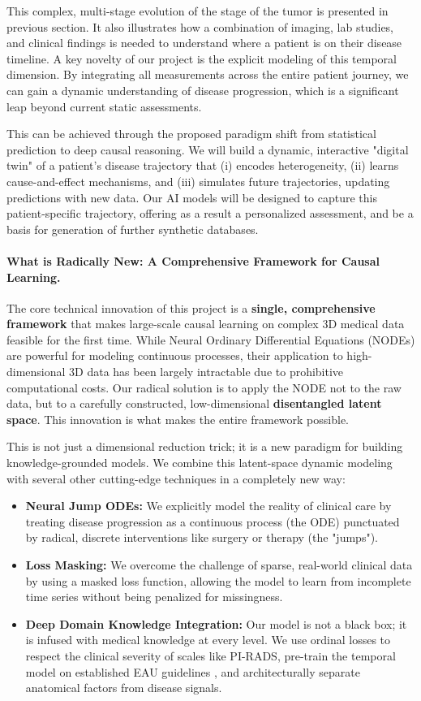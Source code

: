 \documentclass[11pt, a4paper]{article}
\begin{document}
This complex, multi-stage evolution of the stage of the tumor is presented in previous section. It also illustrates how a combination of imaging, lab studies, and clinical findings is needed to understand where a patient is on their disease timeline. A key novelty of our project is the explicit modeling of this temporal dimension. By integrating all measurements across the entire patient journey, we can gain a dynamic understanding of disease progression, which is a significant leap beyond current static assessments.

This can be achieved through  the proposed paradigm shift from statistical prediction to deep causal reasoning. We will build a dynamic, interactive "digital twin" of a patient’s disease trajectory that (i) encodes heterogeneity, (ii) learns cause-and-effect mechanisms, and (iii) simulates future trajectories, updating predictions with new data. Our AI models will be designed to capture this patient-specific trajectory, offering as a result a personalized assessment, and be a basis for generation of further synthetic databases.


\paragraph{What is Radically New: A Comprehensive Framework for Causal Learning.}
The core technical innovation of this project is a \textbf{single, comprehensive framework} that makes large-scale causal learning on complex 3D medical data feasible for the first time. While Neural Ordinary Differential Equations (NODEs) are powerful for modeling continuous processes, their application to high-dimensional 3D data has been largely intractable due to prohibitive computational costs. Our radical solution is to apply the NODE not to the raw data, but to a carefully constructed, low-dimensional \textbf{disentangled latent space}. This innovation is what makes the entire framework possible.

This is not just a dimensional reduction trick; it is a new paradigm for building knowledge-grounded models. We combine this latent-space dynamic modeling with several other cutting-edge techniques in a completely new way:
\begin{itemize}
    \item \textbf{Neural Jump ODEs:} We explicitly model the reality of clinical care by treating disease progression as a continuous process (the ODE) punctuated by radical, discrete interventions like surgery or therapy (the "jumps").
    \item \textbf{Loss Masking:} We overcome the challenge of sparse, real-world clinical data by using a masked loss function, allowing the model to learn from incomplete time series without being penalized for missingness.
    \item \textbf{Deep Domain Knowledge Integration:} Our model is not a black box; it is infused with medical knowledge at every level. We use ordinal losses to respect the clinical severity of scales like PI-RADS, pre-train the temporal model on established EAU guidelines \cite{guidelines_uro_1,guidelines_uro_2}, and architecturally separate anatomical factors from disease signals.
\end{itemize}
\end{document}
